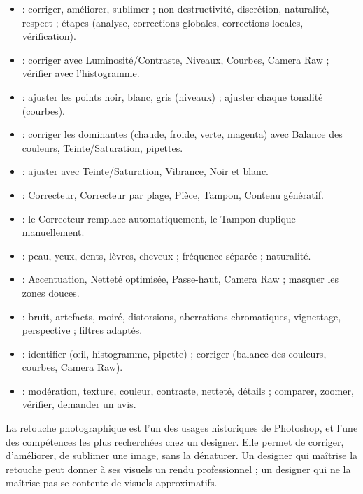 \begin{itemize}
    \item {} : corriger, améliorer, sublimer ; non-destructivité, discrétion, naturalité, respect ; étapes (analyse, corrections globales, corrections locales, vérification).
    \item {} : corriger avec Luminosité/Contraste, Niveaux, Courbes, Camera Raw ; vérifier avec l'histogramme.
    \item {} : ajuster les points noir, blanc, gris (niveaux) ; ajuster chaque tonalité (courbes).
    \item {} : corriger les dominantes (chaude, froide, verte, magenta) avec Balance des couleurs, Teinte/Saturation, pipettes.
    \item {} : ajuster avec Teinte/Saturation, Vibrance, Noir et blanc.
    \item {} : Correcteur, Correcteur par plage, Pièce, Tampon, Contenu génératif.
    \item {} : le Correcteur remplace automatiquement, le Tampon duplique manuellement.
    \item {} : peau, yeux, dents, lèvres, cheveux ; fréquence séparée ; naturalité.
    \item {} : Accentuation, Netteté optimisée, Passe-haut, Camera Raw ; masquer les zones douces.
    \item {} : bruit, artefacts, moiré, distorsions, aberrations chromatiques, vignettage, perspective ; filtres adaptés.
    \item {} : identifier (œil, histogramme, pipette) ; corriger (balance des couleurs, courbes, Camera Raw).
    \item {} : modération, texture, couleur, contraste, netteté, détails ; comparer, zoomer, vérifier, demander un avis.
\end{itemize}

La retouche photographique est l'un des usages historiques de Photoshop, et l'une des compétences les plus recherchées chez un designer. Elle permet de corriger, d'améliorer, de sublimer une image, sans la dénaturer. Un designer qui maîtrise la retouche peut donner à ses visuels un rendu professionnel ; un designer qui ne la maîtrise pas se contente de visuels approximatifs.

